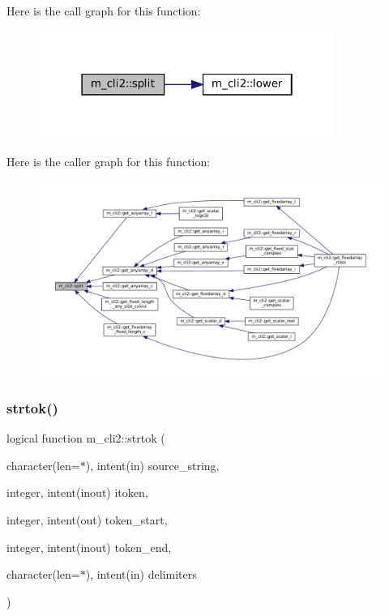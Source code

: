 Here is the call graph for this function\+:\nopagebreak
\begin{figure}[H]
\begin{center}
\leavevmode
\includegraphics[width=274pt]{namespacem__cli2_a6578e29ee4dc56651528e7e0acd29665_cgraph}
\end{center}
\end{figure}
Here is the caller graph for this function\+:\nopagebreak
\begin{figure}[H]
\begin{center}
\leavevmode
\includegraphics[width=350pt]{namespacem__cli2_a6578e29ee4dc56651528e7e0acd29665_icgraph}
\end{center}
\end{figure}
\mbox{\label{namespacem__cli2_a752fd074abce57e636e4572b3e55db3a}} 
\subsubsection{\texorpdfstring{strtok()}{strtok()}}
{\footnotesize\ttfamily logical function m\+\_\+cli2\+::strtok (\begin{DoxyParamCaption}\item[{character(len=$\ast$), intent(in)}]{source\+\_\+string,  }\item[{integer, intent(inout)}]{itoken,  }\item[{integer, intent(out)}]{token\+\_\+start,  }\item[{integer, intent(inout)}]{token\+\_\+end,  }\item[{character(len=$\ast$), intent(in)}]{delimiters }\end{DoxyParamCaption})\hspace{0.3cm}{\ttfamily [private]}}

